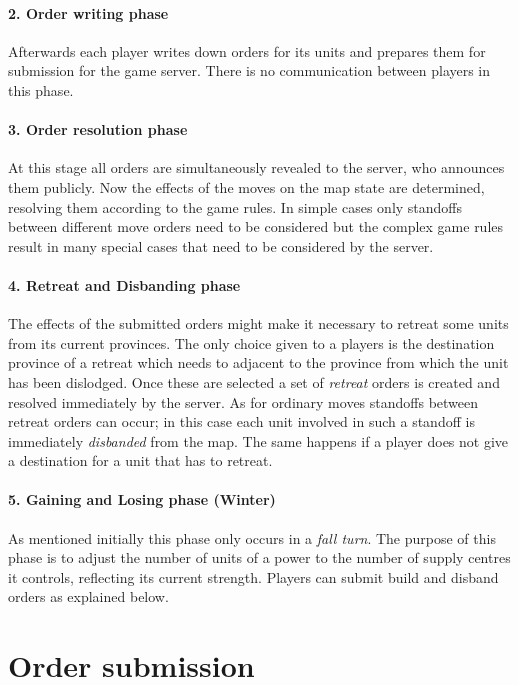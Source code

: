 \documentclass[pdftex,12pt,a4paper]{report}
\begin{document}
\paragraph{2. Order writing phase}
Afterwards each player writes down orders for its units and prepares
them for submission for the game server. There is no communication 
between players in this phase. 

\paragraph{3. Order resolution phase}
At this stage all orders are simultaneously revealed to the server,
who announces them publicly. Now the effects of the moves on the
map state are determined, resolving them according to the game rules.
In simple cases only standoffs between different move orders need
to be considered but the complex game rules result in many special
cases that need to be considered by the server. 

\paragraph{4. Retreat and Disbanding phase}
The effects of the submitted orders might make it necessary to retreat
some units from its current provinces. The only choice given to a
players is the destination province of a retreat which needs to
adjacent to the province from which the unit has been dislodged. Once
these are selected a set of \textit{retreat} orders is created and
resolved immediately by the server. As for ordinary moves standoffs
between retreat orders can occur; in this case each unit involved in
such a standoff is immediately \textit{disbanded} from the map. The
same happens if a player does not give a destination for a unit that
has to retreat.

\paragraph{5. Gaining and Losing phase (Winter)}
As mentioned initially this phase only occurs in a \textit{fall turn}.
The purpose of this phase is to adjust the number of units of a power
to the number of supply centres it controls, reflecting its current
strength. Players can submit build and disband orders as explained
below. 

\section{Order submission}
\end{document}
